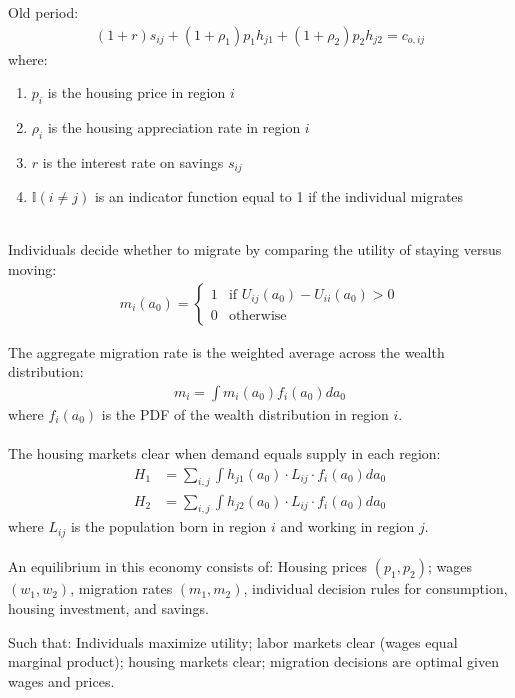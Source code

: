 \documentclass[12pt,letterpaper]{article}
\begin{document}
	Old period:
	\begin{align*}
		(1+r)s_{ij} + (1+\rho_1)p_1h_{j1} + (1+\rho_2)p_2h_{j2} = c_{o,ij}
	\end{align*}
	where:
	\begin{enumerate}
		\item $p_i$ is the housing price in region $i$
		\item $\rho_i$ is the housing appreciation rate in region $i$
		\item $r$ is the interest rate on savings $s_{ij}$
		\item $\mathbb{I}(i \neq j)$ is an indicator function equal to 1 if the individual migrates
	\end{enumerate}
	\smallskip\\
	Individuals decide whether to migrate by comparing the utility of staying versus moving:
	\begin{align*}
		m_i(a_0) = 
		\begin{cases}
			1 & \text{if } U_{ij}(a_0) - U_{ii}(a_0) > 0 \\
			0 & \text{otherwise}
		\end{cases}
	\end{align*}
	
	The aggregate migration rate is the weighted average across the wealth distribution:
	\begin{align*}
		m_i = \int m_i(a_0) f_i(a_0) da_0
	\end{align*}
	where $f_i(a_0)$ is the PDF of the wealth distribution in region $i$.\smallskip\\
	\smallskip\\
	The housing markets clear when demand equals supply in each region:
	\begin{align*}
		H_1 &= \sum_{i,j} \int h_{j1}(a_0) \cdot L_{ij} \cdot f_i(a_0) da_0 \\
		H_2 &= \sum_{i,j} \int h_{j2}(a_0) \cdot L_{ij} \cdot f_i(a_0) da_0
	\end{align*}
	where $L_{ij}$ is the population born in region $i$ and working in region $j$.\smallskip\\
	\smallskip\\
	An equilibrium in this economy consists of: Housing prices $(p_1, p_2)$; wages $(w_1, w_2)$, migration rates $(m_1, m_2)$, individual decision rules for consumption, housing investment, and savings. 
	
	Such that: Individuals maximize utility; labor markets clear (wages equal marginal product); housing markets clear; migration decisions are optimal given wages and prices.
	
\end{document}
